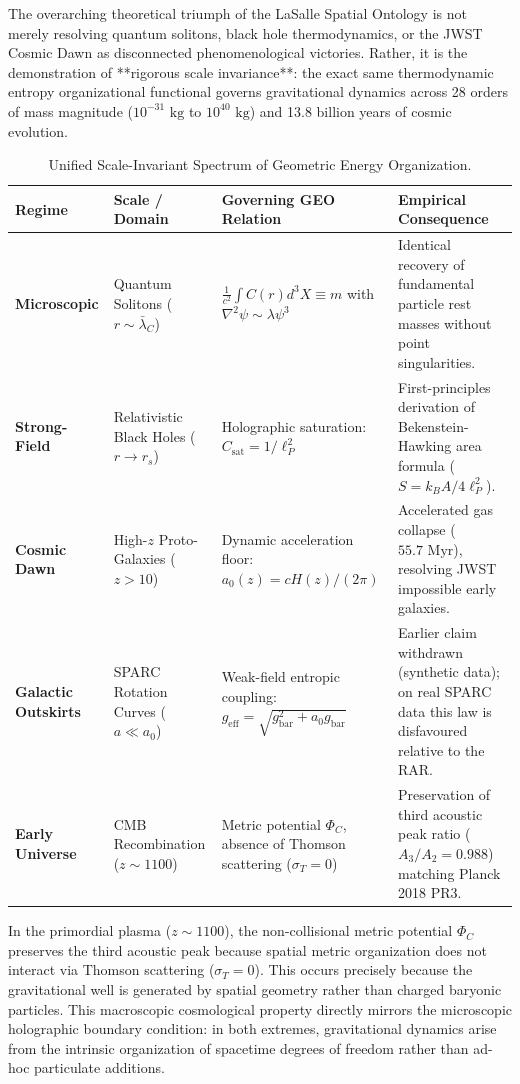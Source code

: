 \documentclass[11pt,a4paper]{article}
\begin{document}
The overarching theoretical triumph of the LaSalle Spatial Ontology is not merely resolving quantum solitons, black hole thermodynamics, or the JWST Cosmic Dawn as disconnected phenomenological victories. Rather, it is the demonstration of **rigorous scale invariance**: the exact same thermodynamic entropy organizational functional governs gravitational dynamics across 28 orders of mass magnitude ($10^{-31}\text{ kg}$ to $10^{40}\text{ kg}$) and 13.8 billion years of cosmic evolution.

\begin{table}[htbp]
\centering
\small
\caption{Unified Scale-Invariant Spectrum of Geometric Energy Organization.}
\label{tab:scale_invariance}
\begin{tabularx}{\textwidth}{lp{3.5cm}p{4cm}X}
\toprule
\textbf{Regime} & \textbf{Scale / Domain} & \textbf{Governing GEO Relation} & \textbf{Empirical Consequence} \\
\midrule
\textbf{Microscopic} & Quantum Solitons ($r \sim \bar{\lambda}_C$) & $\frac{1}{c^2}\int C(r) d^3X \equiv m$ with $\nabla^2\psi \sim \lambda\psi^3$ & Identical recovery of fundamental particle rest masses without point singularities. \\
\textbf{Strong-Field} & Relativistic Black Holes ($r \to r_s$) & Holographic saturation: $C_{\text{sat}} = 1/\ell_P^2$ & First-principles derivation of Bekenstein-Hawking area formula ($S = k_B A / 4\ell_P^2$). \\
\textbf{Cosmic Dawn} & High-$z$ Proto-Galaxies ($z > 10$) & Dynamic acceleration floor: $a_0(z) = c H(z) / (2\pi)$ & Accelerated gas collapse ($55.7\text{ Myr}$), resolving JWST impossible early galaxies. \\
\textbf{Galactic Outskirts} & SPARC Rotation Curves ($a \ll a_0$) & Weak-field entropic coupling: $g_{\text{eff}} = \sqrt{g_{\text{bar}}^2 + a_0 g_{\text{bar}}}$ & Earlier claim withdrawn (synthetic data); on real SPARC data this law is disfavoured relative to the RAR. \\
\textbf{Early Universe} & CMB Recombination ($z \sim 1100$) & Metric potential $\Phi_C$, absence of Thomson scattering ($\sigma_T = 0$) & Preservation of third acoustic peak ratio ($A_3/A_2 = 0.988$) matching Planck 2018 PR3. \\
\bottomrule
\end{tabularx}
\end{table}

In the primordial plasma ($z \sim 1100$), the non-collisional metric potential $\Phi_C$ preserves the third acoustic peak because spatial metric organization does not interact via Thomson scattering ($\sigma_T = 0$). This occurs precisely because the gravitational well is generated by spatial geometry rather than charged baryonic particles. This macroscopic cosmological property directly mirrors the microscopic holographic boundary condition: in both extremes, gravitational dynamics arise from the intrinsic organization of spacetime degrees of freedom rather than ad-hoc particulate additions.
\end{document}
